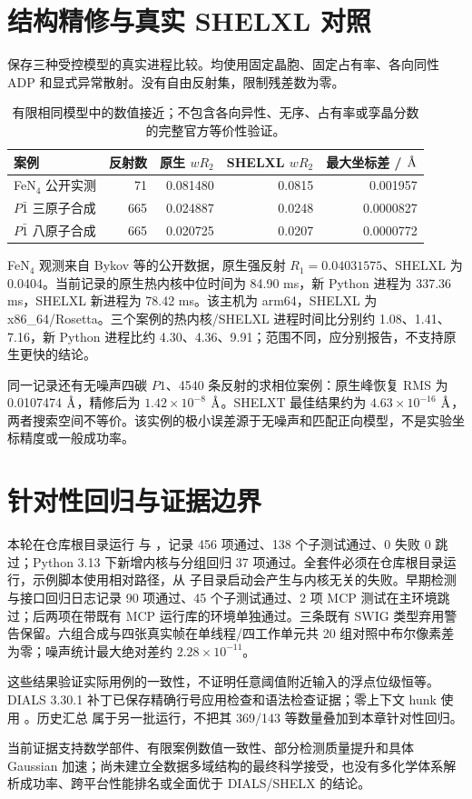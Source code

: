 \section{结构精修与真实 SHELXL 对照}
 保存三种受控模型的真实进程比较。均使用固定晶胞、固定占有率、各向同性 ADP 和显式异常散射。没有自由反射集，限制残差数为零。
\begin{table}[htbp]\centering\small
\begin{tabularx}{\textwidth}{Xrrrr}
\toprule 案例 & 反射数 & 原生 $wR_2$ & SHELXL $wR_2$ & 最大坐标差 / $\text{\AA}$\\\midrule
FeN$_4$ 公开实测 & 71 & 0.081480 & 0.0815 & 0.001957\\
$P\bar1$ 三原子合成 & 665 & 0.024887 & 0.0248 & 0.0000827\\
$P\bar1$ 八原子合成 & 665 & 0.020725 & 0.0207 & 0.0000772\\
\bottomrule
\end{tabularx}
\caption{有限相同模型中的数值接近；不包含各向异性、无序、占有率或孪晶分数的完整官方等价性验证。}
\end{table}
FeN$_4$ 观测来自 Bykov 等的公开数据\cite{fen4_2018}，原生强反射 $R_1=0.04031575$、SHELXL 为 0.0404。当前记录的原生热内核中位时间为 84.90 ms，新 Python 进程为 337.36 ms，SHELXL 新进程为 78.42 ms。该主机为 arm64，SHELXL 为 x86\_64/Rosetta。三个案例的热内核/SHELXL 进程时间比分别约 1.08、1.41、7.16，新 Python 进程比约 4.30、4.36、9.91；范围不同，应分别报告，不支持原生更快的结论。

同一记录还有无噪声四碳 $P1$、4540 条反射的求相位案例：原生峰恢复 RMS 为 0.0107474 $\text{\AA}$，精修后为 $1.42\times10^{-8}$ $\text{\AA}$。SHELXT 最佳结果约为 $4.63\times10^{-16}$ $\text{\AA}$，两者搜索空间不等价。该实例的极小误差源于无噪声和匹配正向模型，不是实验坐标精度或一般成功率。
\section{针对性回归与证据边界}
本轮在仓库根目录运行  与 ，记录 456 项通过、138 个子测试通过、0 失败 0 跳过；Python 3.13 下新增内核与分组回归 37 项通过。全套件必须在仓库根目录运行，示例脚本使用相对路径，从  子目录启动会产生与内核无关的失败。早期检测与接口回归日志记录 90 项通过、45 个子测试通过、2 项 MCP 测试在主环境跳过；后两项在带既有 MCP 运行库的环境单独通过。三条既有 SWIG 类型弃用警告保留。六组合成与四张真实帧在单线程/四工作单元共 20 组对照中布尔像素差为零；噪声统计最大绝对差约 $2.28\times10^{-11}$。

这些结果验证实际用例的一致性，不证明任意阈值附近输入的浮点位级恒等。DIALS 3.30.1 补丁已保存精确行号应用检查和语法检查证据；零上下文 hunk 使用 。历史汇总  属于另一批运行，不把其 369/143 等数量叠加到本章针对性回归。

当前证据支持数学部件、有限案例数值一致性、部分检测质量提升和具体 Gaussian 加速；尚未建立全数据多域结构的最终科学接受，也没有多化学体系解析成功率、跨平台性能排名或全面优于 DIALS/SHELX 的结论。
